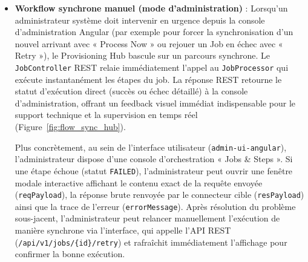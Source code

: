 \begin{itemize}
\begin{figure}[H]
        \caption{Flux asynchrone automatique découplé (RabbitMQ)}
        \label{fig:flow_async_hub}
    \end{figure}

    \item \textbf{Workflow synchrone manuel (mode d'administration)} : Lorsqu'un administrateur système doit intervenir en urgence depuis la console d'administration Angular (par exemple pour forcer la synchronisation d'un nouvel arrivant avec « Process Now » ou rejouer un Job en échec avec « Retry »), le Provisioning Hub bascule sur un parcours synchrone. Le \texttt{JobController} REST relaie immédiatement l'appel au \texttt{JobProcessor} qui exécute instantanément les étapes du job. La réponse REST retourne le statut d'exécution direct (succès ou échec détaillé) à la console d'administration, offrant un feedback visuel immédiat indispensable pour le support technique et la supervision en temps réel (Figure~\ref{fig:flow_sync_hub}).
    
    Plus concrètement, au sein de l'interface utilisateur (\texttt{admin-ui-angular}), l'administrateur dispose d'une console d'orchestration « Jobs \& Steps ». Si une étape échoue (statut \texttt{FAILED}), l'administrateur peut ouvrir une fenêtre modale interactive affichant le contenu exact de la requête envoyée (\texttt{reqPayload}), la réponse brute renvoyée par le connecteur cible (\texttt{resPayload}) ainsi que la trace de l'erreur (\texttt{errorMessage}). Après résolution du problème sous-jacent, l'administrateur peut relancer manuellement l'exécution de manière synchrone via l'interface, qui appelle l'API REST (\texttt{/api/v1/jobs/\{id\}/retry}) et rafraîchit immédiatement l'affichage pour confirmer la bonne exécution.
    

\end{itemize}
